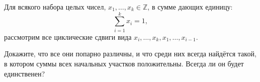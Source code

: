 Для всякого набора целых чисел, $x_1, \ldots, x_k \in \mathbb{Z}$, в сумме дающих единицу:
$$
    \sum\limits_{i = 1}^k x_i = 1,
$$
рассмотрим все циклические сдвиги вида $x_i, \ldots, x_k, x_1, \ldots, x_{i - 1}$.

Докажите, что все они попарно различны, и что среди них всегда найдётся такой, в котором суммы всех
начальных участков положительны. Всегда ли он будет единственен?
